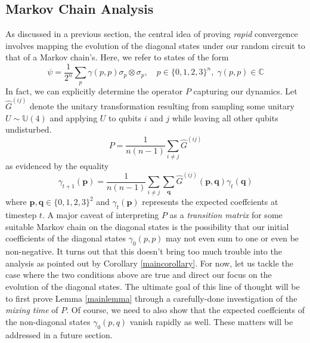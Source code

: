 \documentclass[12pt]{amsart}
\theoremstyle{definition}
\theoremstyle{remark}
\numberwithin{equation}{section}
\theoremstyle{remark}
\begin{document}
\subsection{Markov Chain Analysis}
As discussed in a previous section, the central idea of proving \emph{rapid} convergence involves mapping the evolution of the diagonal states under our random circuit to that of a Markov chain's. Here, we refer to states of the form
$$ \psi = \frac{1}{2^n}\sum_{p}\gamma(p,p) \sigma_{p} \otimes \sigma_{p}, \quad p \in \{0,1,2,3\}^n, \; \gamma(p,p) \in \mathbb{C} $$
In fact, we can explicitly determine the operator $P$ capturing our dynamics. Let $\widehat{G}^{(ij)}$ denote the unitary transformation resulting from sampling some unitary $U \sim \mathbb{U}(4)$ and applying $U$ to qubits $i$ and $j$ while leaving all other qubits undisturbed.
%
\begin{equation} \label{schemechain}
P = \frac{1}{n(n-1)}\sum_{i \neq j} \widehat{G}^{(ij)}
\end{equation}
as evidenced by the equality
\begin{equation}
  \gamma_{t+1}(\textbf{p}) = \frac{1}{n(n-1)}\sum_{i \neq j}\sum_{\textbf{q}} \widehat{G}^{(ij)}(\textbf{p},\textbf{q})\gamma_t(\textbf{q})
\end{equation}
where $\textbf{p},\textbf{q} \in \{0,1,2,3\}^2$ and $\gamma_t(\textbf{p})$ represents the expected coeffcients at timestep $t$.
%
A major caveat of interpreting $P$ as a \emph{transition matrix} for some suitable Markov chain on the diagonal states is the possibility that our initial coefficients of the diagonal states $\gamma_0(p,p)$ may not even sum to one or even be non-negative. It turns out that this doesn't bring too much trouble into the analysis as pointed out by Corollary \ref{maincorollary}. For now, let us tackle the case where the two conditions above are true and direct our focus on the evolution of the diagonal states. The ultimate goal of this line of thought will be to first prove Lemma \ref{mainlemma} through a carefully-done investigation of the \emph{mixing time} of $P$. Of course, we need to also show that the expected coeffcients of the non-diagonal states $\gamma_0(p,q)$ vanish rapidly as well. These matters will be addressed in a future section.
\end{document}
